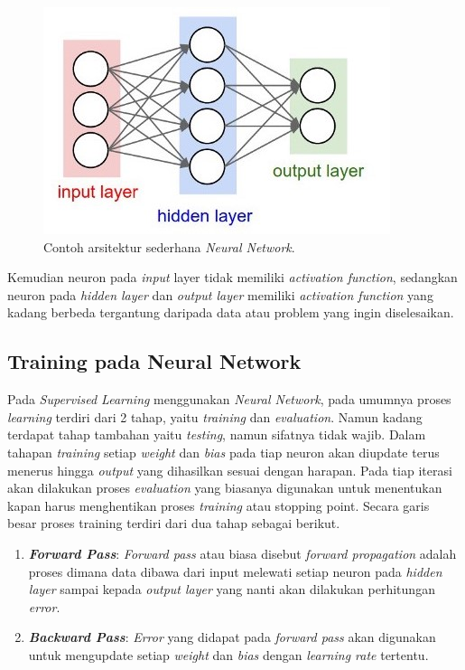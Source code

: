 \begin{figure} [!h] \centering
	\includegraphics[scale=0.9]{img/ann_arch.jpeg}
	\caption{Contoh arsitektur sederhana \textit{Neural Network}.}
	\label{fig:ann_arch}
\end{figure}

Kemudian neuron pada \textit{input} layer tidak memiliki \textit{activation function}, sedangkan neuron pada \textit{hidden layer} dan \textit{output layer} memiliki \textit{activation function} yang kadang berbeda tergantung daripada data atau problem yang ingin diselesaikan.
\vspace{1ex}

\subsection{Training pada Neural Network}
\label{sec:sub_sec2_nn_train}

Pada \textit{Supervised Learning} menggunakan \textit{Neural Network}, pada umumnya proses \textit{learning} terdiri dari 2 tahap, yaitu \textit{training} dan \textit{evaluation}. Namun kadang terdapat tahap tambahan yaitu \textit{testing}, namun sifatnya tidak wajib. Dalam tahapan \textit{training} setiap \textit{weight} dan \textit{bias} pada tiap neuron akan diupdate terus menerus hingga \textit{output} yang dihasilkan sesuai dengan harapan. Pada tiap iterasi akan dilakukan proses \textit{evaluation} yang biasanya digunakan untuk menentukan kapan harus menghentikan proses \textit{training} atau stopping point. Secara garis besar proses training terdiri dari dua tahap sebagai berikut.

\begin{enumerate}[label=\textbf{\alph*.}]
	\item \textbf{\textit{Forward Pass}}: \textit{Forward pass} atau biasa disebut \textit{forward propagation} adalah proses dimana data dibawa dari input melewati setiap neuron pada \textit{hidden layer} sampai kepada \textit{output layer} yang nanti akan dilakukan perhitungan \textit{error}.
	\
	\item \textbf{\textit{Backward Pass}}: \textit{Error} yang didapat pada \textit{forward pass} akan digunakan untuk mengupdate setiap \textit{weight} dan \textit{bias} dengan \textit{learning rate} tertentu.
\end{enumerate}

